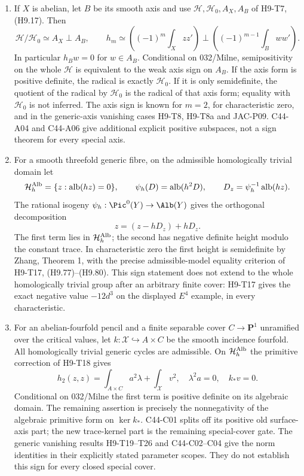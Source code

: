 \begin{theorem}
\begin{enumerate}
\item If $X$ is abelian, let $B$ be its smooth axis and use
$\mathcal H,\mathcal H_0,A_X,A_B$ of H9-T7, (H9.17). Then
\[
 \mathcal H/\mathcal H_0\simeq A_X\mathbin\perp A_B,
 \qquad h_m\simeq
 \left((-1)^m\int_Xzz'\right)\mathbin\perp
 \left((-1)^{m-1}\int_Bww'\right).
 \tag{C44.T05.3}
\]
In particular $h_Bw=0$ for $w\in A_B$. Conditional on 032/Milne,
semipositivity on the whole $\mathcal H$ is equivalent to the weak
axis sign on $A_B$. If the axis form is positive definite, the
radical is exactly $\mathcal H_0$. If it is only semidefinite,
the quotient of the radical by $\mathcal H_0$ is the radical of
that axis form; equality with $\mathcal H_0$ is not inferred.
The axis sign is known for $m=2$, for characteristic zero, and in
the generic-axis vanishing cases H9-T8, H9-T8a and JAC-P09.
C44-A04 and C44-A06 give additional explicit positive subspaces,
not a sign theorem for every special axis.

\item For a smooth threefold generic fibre, on the admissible
homologically trivial domain let
\[
 \mathcal H_h^{\rm Alb}=\{z:\operatorname{alb}(hz)=0\},\qquad
 \psi_h(D)=\operatorname{alb}(h^2D),\qquad
 D_z=\psi_h^{-1}\operatorname{alb}(hz).
\]
The rational isogeny $\psi_h:\Pic^0(Y)\to\Alb(Y)$ gives the
orthogonal decomposition
\[
                    z=(z-hD_z)+hD_z.
 \tag{C44.T05.4}
\]
The first term lies in $\mathcal H_h^{\rm Alb}$; the second has
negative definite height modulo the constant trace. In
characteristic zero the first height is semidefinite by Zhang,
Theorem 1, with the precise admissible-model equality criterion
of H9-T17, (H9.77)--(H9.80). This sign statement does not extend
to the whole homologically trivial group after an arbitrary
finite cover: H9-T17 gives the exact negative value $-12d^3$ on
the displayed $E^4$ example, in every characteristic.

\item For an abelian-fourfold pencil and a finite separable cover
$C\to\mathbf P^1$ unramified over the critical values, let
$k:\mathcal X\hookrightarrow A\times C$ be the smooth incidence
fourfold. All homologically trivial generic cycles are admissible.
On $\mathcal H_h^{\rm Alb}$ the primitive correction of H9-T18
gives
\[
              h_2(z,z)=\int_{A\times C}a^2\lambda
                              +\int_{\mathcal X}v^2,
 \quad \lambda^2a=0,\quad k_*v=0.
 \tag{C44.T05.5}
\]
Conditional on 032/Milne the first term is positive definite on
its algebraic domain. The remaining assertion is precisely the
nonnegativity of the algebraic primitive form on $\ker k_*$.
C44-C01 splits off its positive old surface-axis part; the new
trace-kernel part is the remaining special-cover gate. The
generic vanishing results H9-T19--T26 and C44-C02--C04 give
the norm identities in their explicitly stated parameter scopes.
They do not establish this sign for every closed special cover.
\end{enumerate}
\end{theorem}

